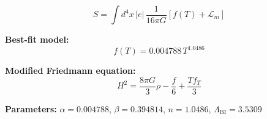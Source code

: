
\begin{equation}
  S = \int d^4x \, |e| \, \frac{1}{16\pi G} \left[ f(T) + \mathcal{L}_m \right]
\end{equation}

\textbf{Best-fit model:}
\begin{equation}
  f(T) = 0.004788 \, T^{1.0486}
\end{equation}

\textbf{Modified Friedmann equation:}
\begin{equation}
  H^2 = \frac{8\pi G}{3} \rho - \frac{f}{6} + \frac{T f_T}{3}
\end{equation}

\textbf{Parameters:}
$\alpha = 0.004788$, \quad
$\beta = 0.394814$, \quad
$n = 1.0486$, \quad
$\Lambda_{\text{BI}} = 3.5309$